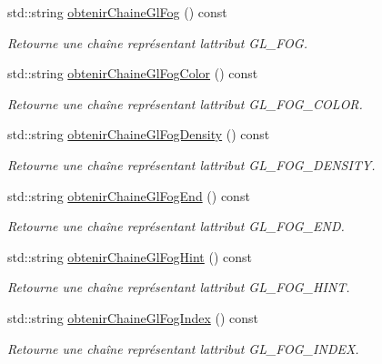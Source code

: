 \begin{DoxyCompactItemize}
std\+::string \hyperlink{group__utilitaire_ga73b3d82b8c3940a818e1dab3d69e4899}{obtenir\+Chaine\+Gl\+Fog} () const 
\begin{DoxyCompactList}\small\item\em Retourne une chaîne représentant l\textquotesingle{}attribut G\+L\+\_\+\+F\+O\+G. \end{DoxyCompactList}\item 
std\+::string \hyperlink{group__utilitaire_ga572f199118c8cb77085a7eb21f05f7fb}{obtenir\+Chaine\+Gl\+Fog\+Color} () const 
\begin{DoxyCompactList}\small\item\em Retourne une chaîne représentant l\textquotesingle{}attribut G\+L\+\_\+\+F\+O\+G\+\_\+\+C\+O\+L\+O\+R. \end{DoxyCompactList}\item 
std\+::string \hyperlink{group__utilitaire_ga9ad8c1de41bc053666ffe001bca8f064}{obtenir\+Chaine\+Gl\+Fog\+Density} () const 
\begin{DoxyCompactList}\small\item\em Retourne une chaîne représentant l\textquotesingle{}attribut G\+L\+\_\+\+F\+O\+G\+\_\+\+D\+E\+N\+S\+I\+T\+Y. \end{DoxyCompactList}\item 
std\+::string \hyperlink{group__utilitaire_ga9c6edbc286eed9a47b2e3ed2426e2b92}{obtenir\+Chaine\+Gl\+Fog\+End} () const 
\begin{DoxyCompactList}\small\item\em Retourne une chaîne représentant l\textquotesingle{}attribut G\+L\+\_\+\+F\+O\+G\+\_\+\+E\+N\+D. \end{DoxyCompactList}\item 
std\+::string \hyperlink{group__utilitaire_ga8bd30ecaffe9f7d38e7a447a185dc8d0}{obtenir\+Chaine\+Gl\+Fog\+Hint} () const 
\begin{DoxyCompactList}\small\item\em Retourne une chaîne représentant l\textquotesingle{}attribut G\+L\+\_\+\+F\+O\+G\+\_\+\+H\+I\+N\+T. \end{DoxyCompactList}\item 
std\+::string \hyperlink{group__utilitaire_ga929e0d580e014af6abda36f16fce43c3}{obtenir\+Chaine\+Gl\+Fog\+Index} () const 
\begin{DoxyCompactList}\small\item\em Retourne une chaîne représentant l\textquotesingle{}attribut G\+L\+\_\+\+F\+O\+G\+\_\+\+I\+N\+D\+E\+X. \end{DoxyCompactList}\item 

\end{DoxyCompactItemize}
